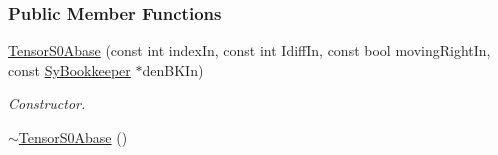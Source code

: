\subsubsection*{Public Member Functions}
\begin{DoxyCompactItemize}
\item 
\hyperlink{classCheMPS2_1_1TensorS0Abase_a173d2d9371a7a902a213c44fd7ae9d2a}{Tensor\-S0\-Abase} (const int index\-In, const int Idiff\-In, const bool moving\-Right\-In, const \hyperlink{classCheMPS2_1_1SyBookkeeper}{Sy\-Bookkeeper} $\ast$den\-B\-K\-In)
\begin{DoxyCompactList}\small\item\em Constructor. \end{DoxyCompactList}\item 
\hypertarget{classCheMPS2_1_1TensorS0Abase_a43d958e9fe840f20e760f9e7541da14b}{\hyperlink{classCheMPS2_1_1TensorS0Abase_a43d958e9fe840f20e760f9e7541da14b}{$\sim$\-Tensor\-S0\-Abase} ()}\label{classCheMPS2_1_1TensorS0Abase_a43d958e9fe840f20e760f9e7541da14b}


\end{DoxyCompactItemize}
